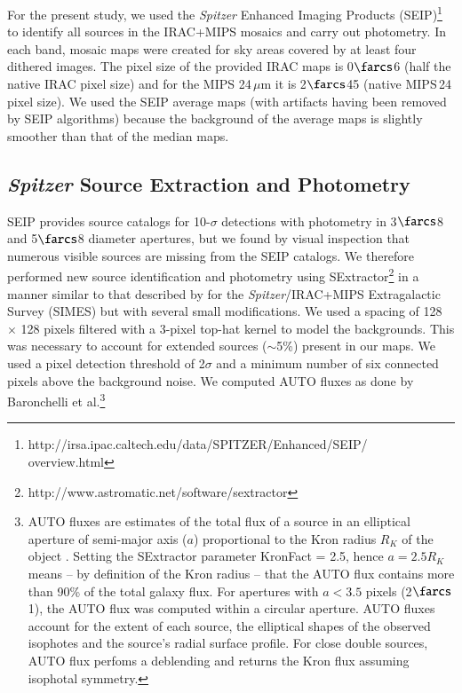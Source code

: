 \documentclass[mathleft,fleqn,%
]{an}
\begin{document}
For the present study, we used the {\it Spitzer} Enhanced Imaging Products
(SEIP)\footnote{http://irsa.ipac.caltech.edu/data/SPITZER/Enhanced/SEIP/
overview.html}
to identify all sources in the IRAC+MIPS mosaics and carry out photometry.
In each band, mosaic maps were created for sky areas covered by at least
four dithered images. 
The pixel size of the provided IRAC maps is 0$\farcs$6 (half the
native IRAC pixel size) and for the 
MIPS 24\,$\mu$m it is 2$\farcs$45 (native MIPS\,24 pixel size). 
We used the SEIP average maps (with artifacts having been removed by
SEIP algorithms) because the
background of the average maps is slightly smoother than that of the
median maps.  

\subsection{{\it Spitzer} Source Extraction and Photometry}
\label{sec:data_spitzer_extraction}

SEIP provides source catalogs for 10-$\sigma$
detections with photometry in 3$\farcs$8 and 5$\farcs$8 diameter apertures, 
but we found by visual inspection that numerous visible sources are 
missing from the SEIP catalogs.
We therefore performed new source identification 
and photometry using SExtractor\footnote{http://www.astromatic.net/software/sextractor}  
\citep{Bertin96} in a manner similar to that 
described by \citet{Baronchelli16} for the {\it Spitzer}/IRAC+MIPS 
Extragalactic Survey (SIMES) but with several small modifications. 
%
We used a spacing of 128 $\times$ 128 pixels
filtered with a 
 3-pixel top-hat kernel to model the backgrounds. This was necessary to 
account for extended sources ($\sim$5\%) present in our maps. 
We used a pixel detection threshold of 2$\sigma$ and a minimum number of six
connected pixels above the background noise.  
We computed AUTO fluxes as done by Baronchelli et al.\footnote{AUTO
  fluxes 
  are estimates of the total flux of a
  source in an 
  elliptical aperture of semi-major axis ($a$) proportional to the Kron
  radius  $R_K$ of the object \citep{Kron80}. Setting 
  the SExtractor parameter KronFact = 2.5, hence $a = 2.5 R_K$ means -- by
  definition of the Kron
  radius -- that the AUTO flux contains more
  than 90\% of the total galaxy flux. 
  For apertures with $a < 3.5$ pixels (2$\farcs$1), the AUTO flux was
  computed within a circular aperture.
  AUTO fluxes account for the extent of each source, the
  elliptical shapes of the observed isophotes and the source's radial
  surface profile. 
  For close double sources, AUTO flux perfoms a deblending and 
  returns the Kron flux assuming
  isophotal symmetry. 
}
\end{document}
